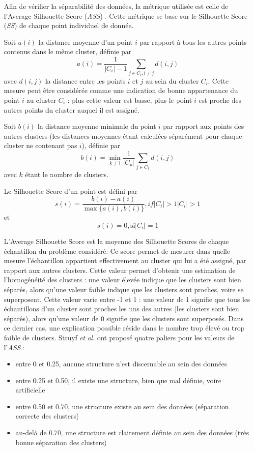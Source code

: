Afin de vérifier la séparabilité des données, la métrique utilisée est celle de l'Average Silhouette Score (\textit{ASS}) \parencite{Rousseeuw1987Sag}. Cette métrique se base sur le Silhouette Score (\textit{SS}) de chaque point individuel de donnée.

Soit $a(i)$ la distance moyenne d'un point $i$ par rapport à tous les autres points contenus dans le même cluster, définie par
\[a(i)={\frac {1}{|C_{i}|-1}}\sum _{j\in C_{i},i\neq j}d(i,j)\]
avec $d(i,j)$ la distance entre les points $i$ et $j$ au sein du cluster $C_i$. Cette mesure peut être considérée comme une indication de bonne appartenance du point $i$ au cluster $C_i$ : plus cette valeur est basse, plus le point $i$ est proche des autres points du cluster auquel il est assigné.

Soit $b(i)$ la distance moyenne minimale du point $i$ par rapport aux points des autres clusters (les distances moyennes étant calculées séparément pour chaque cluster ne contenant pas $i$), définie par
\[b(i)=\min _{k\neq i}{\frac {1}{|C_{k}|}}\sum _{j\in C_{k}}d(i,j)\]
avec $k$ étant le nombre de clusters.

Le Silhouette Score d'un point est défini par
\[s(i)={\frac {b(i)-a(i)}{\max\{a(i),b(i)\}}}, if |C_{i}|>1 |C_{i}|>1\]
et
\[s(i)=0, \text{si} |C_{i}|=1\]

L'Average Silhouette Score est la moyenne des Silhouette Scores de chaque échantillon du problème considéré. Ce score permet de mesurer dans quelle mesure l'échantillon appartient effectivement au cluster qui lui a été assigné, par rapport aux autres clusters. Cette valeur permet d'obtenir une estimation de l'homogénéité des clusters : une valeur élevée indique que les clusters sont bien séparés, alors qu'une valeur faible indique que les clusters sont proches, voire se superposent. Cette valeur varie entre -1 et 1 : une valeur de 1 signifie que tous les échantillons d'un cluster sont proches les uns des autres (les clusters sont bien séparés), alors qu'une valeur de 0 signifie que les clusters sont superposés. Dans ce dernier cas, une explication possible réside dans le nombre trop élevé ou trop faible de clusters. Struyf \textit{et al.} \parencite{Struyf1997Cia} ont proposé quatre paliers pour les valeurs de l'\textit{ASS} :
\begin{itemize}
	\item entre 0 et 0.25, aucune structure n'est discernable au sein des données
	\item entre 0.25 et 0.50, il existe une structure, bien que mal définie, voire artificielle
	\item entre 0.50 et 0.70, une structure existe au sein des données (séparation correcte des clusters)
	\item au-delà de 0.70, une structure est clairement définie au sein des données (très bonne séparation des clusters)
\end{itemize}

